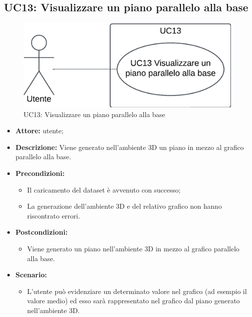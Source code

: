 \subsection{UC13: Visualizzare un piano parallelo alla base}
\begin{figure}[h!]\centering
    \includegraphics[scale=0.7]{template/images/UC13.png}
    \caption{UC13: Visualizzare un piano parallelo alla base}
\end{figure}
\begin{itemize}    
    \item \textbf{Attore:} utente;
    \item \textbf{Descrizione:} Viene generato nell'ambiente 3D un piano in mezzo al grafico parallelo alla base.
    \item \textbf{Precondizioni:}    
        \begin{itemize}
            \item Il caricamento del dataset è avvenuto con successo;
            \item La generazione dell'ambiente 3D e del relativo grafico non hanno riscontrato errori.
        \end{itemize}    
    \item \textbf{Postcondizioni:}
        \begin{itemize}
            \item Viene generato un piano nell'ambiente 3D in mezzo al grafico parallelo alla base.
        \end{itemize}    
    \item \textbf{Scenario:} 
        \begin{itemize}
            \item L'utente può evidenziare un determinato valore nel grafico (ad esempio il valore medio) ed esso sarà rappresentato nel grafico dal piano generato nell'ambiente 3D.
        \end{itemize}
\end{itemize}

